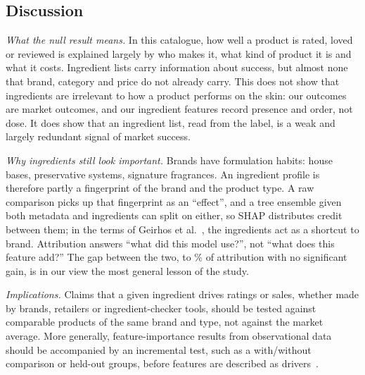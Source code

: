 \documentclass[11pt,a4paper]{article}
\newcommand{\draft}[1]{{\color{blue!70!black}#1}}
\begin{document}
\subsection{Discussion}
\draft{\emph{What the null result means.} In this catalogue, how well a product is rated, loved or reviewed is explained largely by who makes it, what kind of product it is and what it costs. Ingredient lists carry information about success, but almost none that brand, category and price do not already carry. This does not show that ingredients are irrelevant to how a product performs on the skin: our outcomes are market outcomes, and our ingredient features record presence and order, not dose. It does show that an ingredient list, read from the label, is a weak and largely redundant signal of market success.

\emph{Why ingredients still look important.} Brands have formulation habits: house bases, preservative systems, signature fragrances. An ingredient profile is therefore partly a fingerprint of the brand and the product type. A raw comparison picks up that fingerprint as an ``effect'', and a tree ensemble given both metadata and ingredients can split on either, so SHAP distributes credit between them; in the terms of Geirhos et al.~\cite{geirhos2020}, the ingredients act as a shortcut to brand. Attribution answers ``what did this model use?'', not ``what does this feature add?'' The gap between the two, \MinIngredientShare{} to \MaxIngredientShare{}\% of attribution with no significant gain, is in our view the most general lesson of the study.

\emph{Implications.} Claims that a given ingredient drives ratings or sales, whether made by brands, retailers or ingredient-checker tools, should be tested against comparable products of the same brand and type, not against the market average. More generally, feature-importance results from observational data should be accompanied by an incremental test, such as a with/without comparison or held-out groups, before features are described as drivers~\cite{molnar2022}.}
\end{document}
